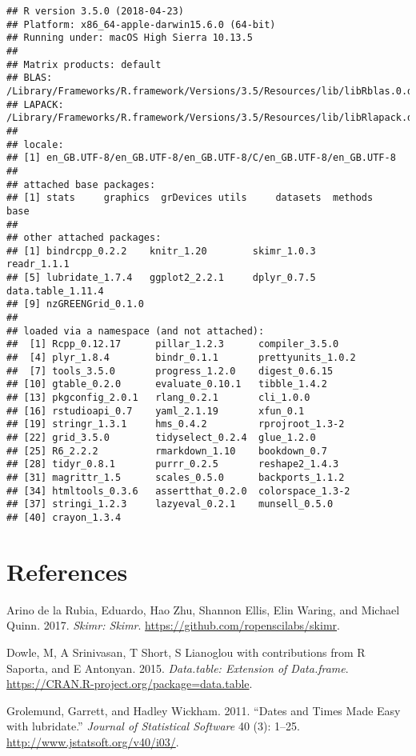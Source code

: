 \documentclass[]{article}
\begin{document}
\begin{verbatim}
## R version 3.5.0 (2018-04-23)
## Platform: x86_64-apple-darwin15.6.0 (64-bit)
## Running under: macOS High Sierra 10.13.5
## 
## Matrix products: default
## BLAS: /Library/Frameworks/R.framework/Versions/3.5/Resources/lib/libRblas.0.dylib
## LAPACK: /Library/Frameworks/R.framework/Versions/3.5/Resources/lib/libRlapack.dylib
## 
## locale:
## [1] en_GB.UTF-8/en_GB.UTF-8/en_GB.UTF-8/C/en_GB.UTF-8/en_GB.UTF-8
## 
## attached base packages:
## [1] stats     graphics  grDevices utils     datasets  methods   base     
## 
## other attached packages:
## [1] bindrcpp_0.2.2    knitr_1.20        skimr_1.0.3       readr_1.1.1      
## [5] lubridate_1.7.4   ggplot2_2.2.1     dplyr_0.7.5       data.table_1.11.4
## [9] nzGREENGrid_0.1.0
## 
## loaded via a namespace (and not attached):
##  [1] Rcpp_0.12.17      pillar_1.2.3      compiler_3.5.0   
##  [4] plyr_1.8.4        bindr_0.1.1       prettyunits_1.0.2
##  [7] tools_3.5.0       progress_1.2.0    digest_0.6.15    
## [10] gtable_0.2.0      evaluate_0.10.1   tibble_1.4.2     
## [13] pkgconfig_2.0.1   rlang_0.2.1       cli_1.0.0        
## [16] rstudioapi_0.7    yaml_2.1.19       xfun_0.1         
## [19] stringr_1.3.1     hms_0.4.2         rprojroot_1.3-2  
## [22] grid_3.5.0        tidyselect_0.2.4  glue_1.2.0       
## [25] R6_2.2.2          rmarkdown_1.10    bookdown_0.7     
## [28] tidyr_0.8.1       purrr_0.2.5       reshape2_1.4.3   
## [31] magrittr_1.5      scales_0.5.0      backports_1.1.2  
## [34] htmltools_0.3.6   assertthat_0.2.0  colorspace_1.3-2 
## [37] stringi_1.2.3     lazyeval_0.2.1    munsell_0.5.0    
## [40] crayon_1.3.4
\end{verbatim}

\section*{References}\label{references}

\hypertarget{refs}{}
\hypertarget{ref-skimr}{}
Arino de la Rubia, Eduardo, Hao Zhu, Shannon Ellis, Elin Waring, and
Michael Quinn. 2017. \emph{Skimr: Skimr}.
\url{https://github.com/ropenscilabs/skimr}.

\hypertarget{ref-data.table}{}
Dowle, M, A Srinivasan, T Short, S Lianoglou with contributions from R
Saporta, and E Antonyan. 2015. \emph{Data.table: Extension of
Data.frame}. \url{https://CRAN.R-project.org/package=data.table}.

\hypertarget{ref-lubridate}{}
Grolemund, Garrett, and Hadley Wickham. 2011. ``Dates and Times Made
Easy with lubridate.'' \emph{Journal of Statistical Software} 40 (3):
1--25. \url{http://www.jstatsoft.org/v40/i03/}.
\end{document}
